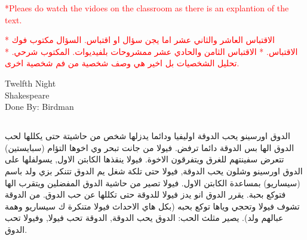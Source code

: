 \documentclass[12pt, a4paper]{article}
\begin{document}
\small{\textcolor{red}{*Pleaes do watch the vidoes on the classroom as 
there is an explantion of the text.\smallbreak}}

\begin{otherlanguage}{arabic}
  \textcolor{red}{
* الاقتباس العاشر والثاني عشر اما يجن سؤال او اقتباس. السؤال مكتوب فوك الاقتباس.\smallbreak
* الاقتباس الثامن والحادي عشر ممشروحات بلفيديوات. المكتوب شرحي.\smallbreak
* تحليل الشخصيات بل اخير هي وصف شخصية من فم شخصية اخرى. 
  }
\end{otherlanguage}

\begin{center}
{\fonthead
\huge{Twelfth Night}\\[0.2cm]
\Large{Shakespeare}\\[0.5cm]
\large{Done By: Birdman}\\[0.6cm]
}
\end{center}

\begin{otherlanguage}{arabic}

\section*{}
الدوق اورسينو يحب الدوقة اوليفيا ودائما يدزلها شخص من حاشيتة حتى يكللها لحب الدوق الها بس الدوقة دائما ترفض.
فيولا من جانت تبحر وي اخوها التؤام (سبايستين) تتعرض سفينتهم للغرق ويتفرقون الاخوة.
فيولا ينقذها الكابتن الاول, يسولفلها على الدوق اورسينو وشلون يحب الدوقة, فيولا حتى تلكة شغل يم الدوق 
تتنكر بزي ولد باسم (سيساريو) بمساعدة الكابتن الاول. فيولا تصير من حاشية الدوق المفضلين ويتقرب الها فتوكع بحبة.
يقرر الدوق انو يدز فيولا للدوقة حتى تكللها عن حب الدوق. من الدوقة تشوف فيولا وتحجي وياها  توكع بحبه (بكل هاي الاحداث
فيولا متنكرة ك سيساريو وهمة عبالهم ولد). يصير مثلث الحب: الدوق يحب الدوقة, الدوقة تحب فيولا, وفيولا تحب الدوق.

  
\end{otherlanguage}

\section*{}
\end{document}
